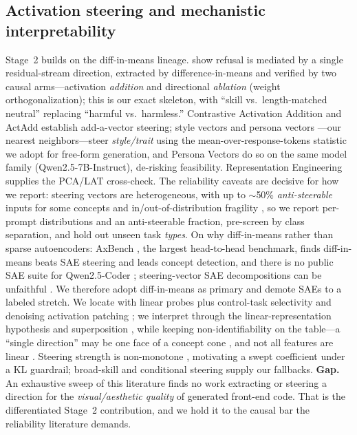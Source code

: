 \subsection{Activation steering and mechanistic interpretability}
Stage~2 builds on the diff-in-means lineage. \citet{arditi2024refusal} show refusal is mediated
by a single residual-stream direction, extracted by difference-in-means and verified by two
causal arms---activation \emph{addition} and directional \emph{ablation} (weight
orthogonalization); this is our exact skeleton, with ``skill vs.\ length-matched neutral''
replacing ``harmful vs.\ harmless.'' Contrastive Activation Addition \citep{rimsky2024caa} and
ActAdd \citep{turner2023actadd} establish add-a-vector steering; style vectors
\citep{konen2024style} and persona vectors \citep{chen2025persona}---our nearest
neighbors---steer \emph{style/trait} using the mean-over-response-tokens statistic we adopt for
free-form generation, and Persona Vectors do so on the same model family
(Qwen2.5-7B-Instruct), de-risking feasibility. Representation Engineering \citep{zou2023repe}
supplies the PCA/LAT cross-check. The reliability caveats are decisive for how we report:
steering vectors are heterogeneous, with up to $\sim$50\% \emph{anti-steerable} inputs for some
concepts \citep{tan2024analysing} and in/out-of-distribution fragility
\citep{dasilva2025steeringoff}, so we report per-prompt distributions and an anti-steerable
fraction, pre-screen by class separation, and hold out unseen task \emph{types}. On why
diff-in-means rather than sparse autoencoders: AxBench \citep{wu2025axbench}, the largest
head-to-head benchmark, finds diff-in-means beats SAE steering and leads concept detection, and
there is no public SAE suite for Qwen2.5-Coder \citep{deng2026qwenscope}; steering-vector SAE
decompositions can be unfaithful \citep{mayne2024decompose}. We therefore adopt diff-in-means as
primary and demote SAEs to a labeled stretch. We locate with linear probes plus control-task
selectivity \citep{hewitt2019control,alain2017probes} and denoising activation patching
\citep{zhang2024patching,heimersheim2024patching}; we interpret through the
linear-representation hypothesis and superposition
\citep{park2023lrh,park2024geometry,elhage2022superposition}, while keeping non-identifiability
on the table---a ``single direction'' may be one face of a concept cone
\citep{wollschlager2025cones}, and not all features are linear \citep{engels2024notlinear}.
Steering strength is non-monotone \citep{taimeskhanov2026strength}, motivating a swept
coefficient under a KL guardrail; broad-skill \citep{vanderweij2024broad} and conditional
\citep{lee2024cast} steering supply our fallbacks. \textbf{Gap.} An exhaustive sweep of this
literature finds no work extracting or steering a direction for the \emph{visual/aesthetic
quality} of generated front-end code. That is the differentiated Stage~2 contribution, and we
hold it to the causal bar the reliability literature demands.
